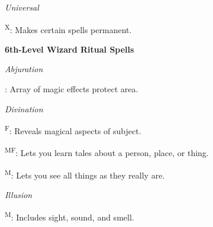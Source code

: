 \noindent\textit{Universal}
\begin{itemize*}
	\item[] \textsuperscript{X}: Makes certain spells permanent.
\end{itemize*}

\noindent\textbf{6th-Level Wizard Ritual Spells}

\noindent\textit{Abjuration}
\begin{itemize*}
	\item[] : Array of magic effects protect area.
\end{itemize*}

\noindent\textit{Divination}
\begin{itemize*}
	\item[] \textsuperscript{F}: Reveals magical aspects of subject.
	\item[] \textsuperscript{MF}: Lets you learn tales about a person, place, or thing.
	\item[] \textsuperscript{M}: Lets you see all things as they really are.
\end{itemize*}

\noindent\textit{Illusion}
\begin{itemize*}
	\item[] \textsuperscript{M}: Includes sight, sound, and smell.
\end{itemize*}

